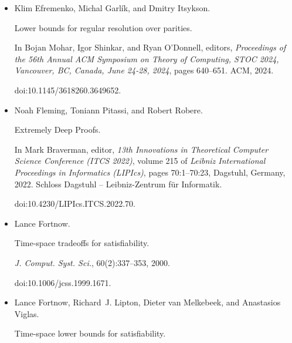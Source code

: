 \documentclass[10pt,a4paper]{article}
\begin{document}
\begin{itemize}
Susanna F. de Rezende, Noah Fleming, Duri Andrea Janett, Jakob Nordström, and
Shuo Pang.


Truly supercritical trade-offs for resolution, cutting planes,
monotone circuits, and weisfeiler-leman, 2024.


doi:10.48550/arXiv.2411.14267.





\item[] 
[13]

Klim Efremenko, Michal Garlík, and Dmitry Itsykson.


Lower bounds for regular resolution over parities.


In Bojan Mohar, Igor Shinkar, and Ryan O’Donnell, editors, \emph{Proceedings of the 56th Annual ACM Symposium on Theory of Computing, STOC
2024, Vancouver, BC, Canada, June 24-28, 2024}, pages 640–651. ACM, 2024.


doi:10.1145/3618260.3649652.





\item[] 
[14]

Noah Fleming, Toniann Pitassi, and Robert Robere.


Extremely Deep Proofs.


In Mark Braverman, editor, \emph{13th Innovations in Theoretical
Computer Science Conference (ITCS 2022)}, volume 215 of \emph{Leibniz
International Proceedings in Informatics (LIPIcs)}, pages 70:1–70:23,
Dagstuhl, Germany, 2022. Schloss Dagstuhl – Leibniz-Zentrum für
Informatik.


doi:10.4230/LIPIcs.ITCS.2022.70.





\item[] 
[15]

Lance Fortnow.


Time-space tradeoffs for satisfiability.


\emph{J. Comput. Syst. Sci.}, 60(2):337–353, 2000.


doi:10.1006/jcss.1999.1671.





\item[] 
[16]

Lance Fortnow, Richard J. Lipton, Dieter van Melkebeek, and Anastasios Viglas.


Time-space lower bounds for satisfiability.



\end{itemize}
\end{document}

